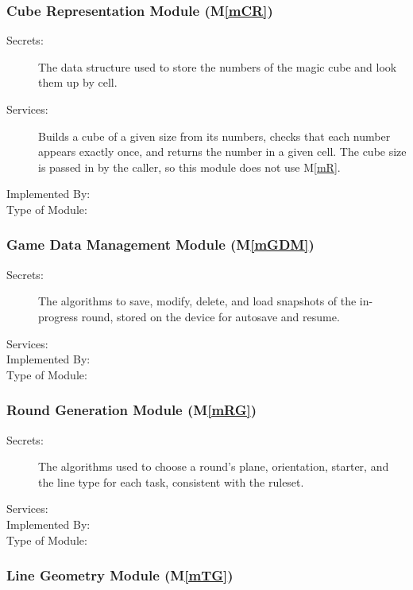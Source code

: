 \documentclass[12pt, titlepage]{article}
\newcommand{\mref}[1]{M\ref{#1}}
\begin{document}
\subsubsection{Cube Representation Module (\mref{mCR})}

\begin{description}
\item[Secrets:] The data structure used to store the numbers of the magic cube and look them up by cell.
\item[Services:] Builds a cube of a given size from its numbers, checks that each number appears exactly once, and returns the number in a given cell. The cube size is passed in by the caller, so this module does not use \mref{mR}.
\item[Implemented By:]
\item[Type of Module:]
\end{description}

\subsubsection{Game Data Management Module (\mref{mGDM})}

\begin{description}
\item[Secrets:] The algorithms to save, modify, delete, and load snapshots of the in-progress round, stored on the device for autosave and resume.
\item[Services:]
\item[Implemented By:]
\item[Type of Module:]
\end{description}

\subsubsection{Round Generation Module (\mref{mRG})}

\begin{description}
\item[Secrets:] The algorithms used to choose a round's plane, orientation, starter, and the line type for each task, consistent with the ruleset.
\item[Services:]
\item[Implemented By:]
\item[Type of Module:]
\end{description}

\subsubsection{Line Geometry Module (\mref{mTG})}
\end{document}
